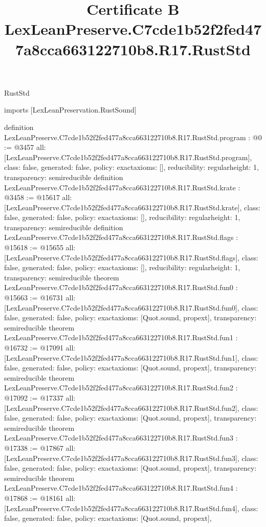 \begin{lexlean}{RustStd}
\title{Certificate B LexLeanPreserve.C7cde1b52f2fed477a8cca663122710b8.R17.RustStd}
\begin{coremodule}
imports [LexLeanPreservation.RustSound]

definition LexLeanPreserve.C7cde1b52f2fed477a8cca663122710b8.R17.RustStd.program : @0 := @3457 {
  all: [LexLeanPreserve.C7cde1b52f2fed477a8cca663122710b8.R17.RustStd.program],
  class: false,
  generated: false,
  policy: exact{axioms: []},
  reducibility: regular{height: 1},
  transparency: semireducible
}
definition LexLeanPreserve.C7cde1b52f2fed477a8cca663122710b8.R17.RustStd.krate : @3458 := @15617 {
  all: [LexLeanPreserve.C7cde1b52f2fed477a8cca663122710b8.R17.RustStd.krate],
  class: false,
  generated: false,
  policy: exact{axioms: []},
  reducibility: regular{height: 1},
  transparency: semireducible
}
definition LexLeanPreserve.C7cde1b52f2fed477a8cca663122710b8.R17.RustStd.flags : @15618 := @15655 {
  all: [LexLeanPreserve.C7cde1b52f2fed477a8cca663122710b8.R17.RustStd.flags],
  class: false,
  generated: false,
  policy: exact{axioms: []},
  reducibility: regular{height: 1},
  transparency: semireducible
}
theorem LexLeanPreserve.C7cde1b52f2fed477a8cca663122710b8.R17.RustStd.fun0 : @15663 := @16731 {
  all: [LexLeanPreserve.C7cde1b52f2fed477a8cca663122710b8.R17.RustStd.fun0],
  class: false,
  generated: false,
  policy: exact{axioms: [Quot.sound, propext]},
  transparency: semireducible
}
theorem LexLeanPreserve.C7cde1b52f2fed477a8cca663122710b8.R17.RustStd.fun1 : @16732 := @17091 {
  all: [LexLeanPreserve.C7cde1b52f2fed477a8cca663122710b8.R17.RustStd.fun1],
  class: false,
  generated: false,
  policy: exact{axioms: [Quot.sound, propext]},
  transparency: semireducible
}
theorem LexLeanPreserve.C7cde1b52f2fed477a8cca663122710b8.R17.RustStd.fun2 : @17092 := @17337 {
  all: [LexLeanPreserve.C7cde1b52f2fed477a8cca663122710b8.R17.RustStd.fun2],
  class: false,
  generated: false,
  policy: exact{axioms: [Quot.sound, propext]},
  transparency: semireducible
}
theorem LexLeanPreserve.C7cde1b52f2fed477a8cca663122710b8.R17.RustStd.fun3 : @17338 := @17867 {
  all: [LexLeanPreserve.C7cde1b52f2fed477a8cca663122710b8.R17.RustStd.fun3],
  class: false,
  generated: false,
  policy: exact{axioms: [Quot.sound, propext]},
  transparency: semireducible
}
theorem LexLeanPreserve.C7cde1b52f2fed477a8cca663122710b8.R17.RustStd.fun4 : @17868 := @18161 {
  all: [LexLeanPreserve.C7cde1b52f2fed477a8cca663122710b8.R17.RustStd.fun4],
  class: false,
  generated: false,
  policy: exact{axioms: [Quot.sound, propext]},
}
\end{coremodule}
\end{lexlean}
